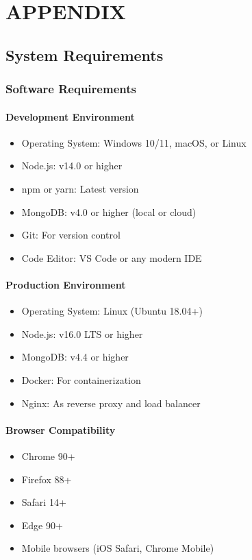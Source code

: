 \chapter{APPENDIX}

\section{System Requirements}

\subsection{Software Requirements}

\subsubsection{Development Environment}
\begin{itemize}
    \item Operating System: Windows 10/11, macOS, or Linux
    \item Node.js: v14.0 or higher
    \item npm or yarn: Latest version
    \item MongoDB: v4.0 or higher (local or cloud)
    \item Git: For version control
    \item Code Editor: VS Code or any modern IDE
\end{itemize}

\subsubsection{Production Environment}
\begin{itemize}
    \item Operating System: Linux (Ubuntu 18.04+)
    \item Node.js: v16.0 LTS or higher
    \item MongoDB: v4.4 or higher
    \item Docker: For containerization
    \item Nginx: As reverse proxy and load balancer
\end{itemize}

\subsubsection{Browser Compatibility}
\begin{itemize}
    \item Chrome 90+
    \item Firefox 88+
    \item Safari 14+
    \item Edge 90+
    \item Mobile browsers (iOS Safari, Chrome Mobile)
\end{itemize}

